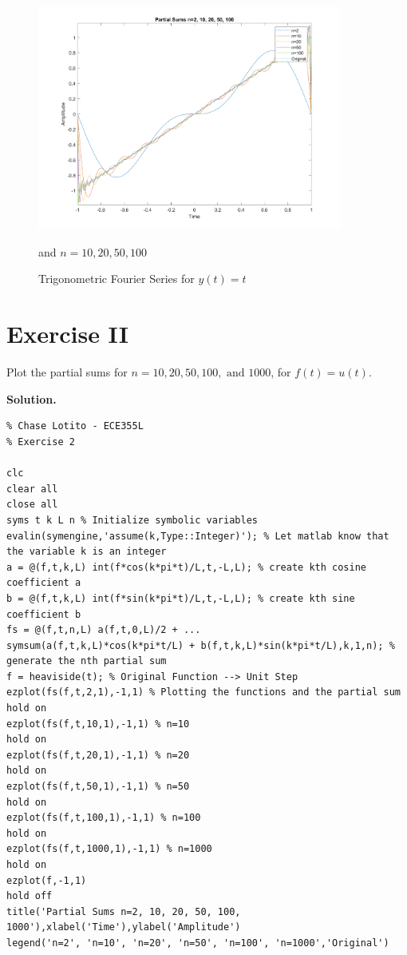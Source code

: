 \documentclass{article}
\begin{document}
\begin{figure}[!ht] 
    \centering
    \includegraphics[width = 10cm]{linear.png}
    \caption{Trigonometric Fourier Series for \(y(t) = t\)} and \(n=10, 20, 50, 100\)
    \label{fig:linear}
\end{figure}

\section*{Exercise II}

Plot the partial sums for \(n = 10, 20, 50, 100, \text{ and } 1000\), for \(f(t) = u(t)\).

\smallskip

\textbf{Solution.}

\smallskip

\begin{lstlisting}
% Chase Lotito - ECE355L
% Exercise 2

clc
clear all
close all
syms t k L n % Initialize symbolic variables
evalin(symengine,'assume(k,Type::Integer)'); % Let matlab know that the variable k is an integer
a = @(f,t,k,L) int(f*cos(k*pi*t)/L,t,-L,L); % create kth cosine coefficient a
b = @(f,t,k,L) int(f*sin(k*pi*t)/L,t,-L,L); % create kth sine coefficient b
fs = @(f,t,n,L) a(f,t,0,L)/2 + ...
symsum(a(f,t,k,L)*cos(k*pi*t/L) + b(f,t,k,L)*sin(k*pi*t/L),k,1,n); % generate the nth partial sum
f = heaviside(t); % Original Function --> Unit Step
ezplot(fs(f,t,2,1),-1,1) % Plotting the functions and the partial sum
hold on
ezplot(fs(f,t,10,1),-1,1) % n=10
hold on
ezplot(fs(f,t,20,1),-1,1) % n=20
hold on
ezplot(fs(f,t,50,1),-1,1) % n=50
hold on
ezplot(fs(f,t,100,1),-1,1) % n=100
hold on
ezplot(fs(f,t,1000,1),-1,1) % n=1000
hold on
ezplot(f,-1,1)
hold off
title('Partial Sums n=2, 10, 20, 50, 100, 1000'),xlabel('Time'),ylabel('Amplitude')
legend('n=2', 'n=10', 'n=20', 'n=50', 'n=100', 'n=1000','Original')
\end{lstlisting}
\end{document}
